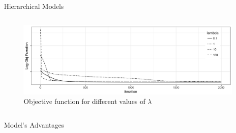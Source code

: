 \documentclass[final]{beamer}
\newlength{\onecolwid}
\newlength{\twocolwid}
\begin{document}
\begin{frame}[t]
\begin{columns}[t]
\begin{column}{\twocolwid}
\begin{columns}[t,totalwidth=\twocolwid]
\begin{column}{\onecolwid}
\begin{block}{Hierarchical Models}
\end{block}


\end{column} %

\end{columns} %



\begin{figure}[h!]
   \centering
   \includegraphics[width=20in]{../R/plot_objective.png} %
   \caption{Objective function for different values of $\lambda$}
   \label{fig:example}
\end{figure}


\begin{columns}[t,totalwidth=\twocolwid] %

\begin{column}{\onecolwid} %


\begin{block}{Model's Advantages}


\end{block}
\end{column}
\end{columns}
\end{column}
\end{columns}
\end{frame}
\end{document}
